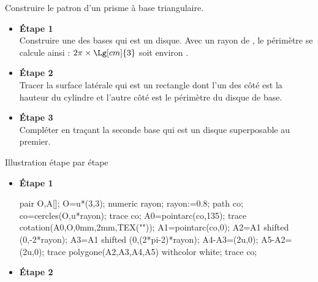     \begin{methode*1}
        \exercice
        Construire le patron d'un prisme à base triangulaire.
        \vspace*{-5mm}
        \begin{multicols}{3}
            \begin{itemize}
                \item \textbf{Étape 1}\\
                Construire une des bases qui est un disque. Avec un rayon de , le périmètre se calcule ainsi : $2\pi \times \Lg[cm]{3}$ soit environ .                \columnbreak
                \item \textbf{Étape 2}\\
                Tracer la surface latérale qui est un rectangle dont l'un des côté est la hauteur du cylindre et l'autre côté est le périmètre du disque de base.
                \columnbreak
                \item \textbf{Étape 3}\\
                Compléter en traçant la seconde base qui est un disque superposable au premier. 
            \end{itemize}
        \end{multicols}
        \vspace*{-7mm}
        \correction
        Illustration étape par étape
        \begin{multicols}{3}
            \begin{itemize}
                \item \textbf{Étape 1}
                
                \smallskip                
                \begin{Geometrie}
                    pair O,A[];
                    O=u*(3,3);
                    numeric rayon;
                    rayon:=0.8;
                    path co;
                    co=cercles(O,u*rayon);
                    trace co;
                    A0=pointarc(co,135);                    
                    trace cotation(A0,O,0mm,2mm,TEX("\tiny{}"));
                    A1=pointarc(co,0);
                    A2=A1 shifted (0,-2*rayon);
                    A3=A1 shifted (0,(2*pi-2)*rayon);
                    A4-A3=(2u,0);
                    A5-A2=(2u,0);
                    trace polygone(A2,A3,A4,A5) withcolor white;
                    trace co;
                \end{Geometrie}
                \columnbreak
                \item \textbf{Étape 2}
                

\end{itemize}
\end{multicols}
\end{methode*1}
